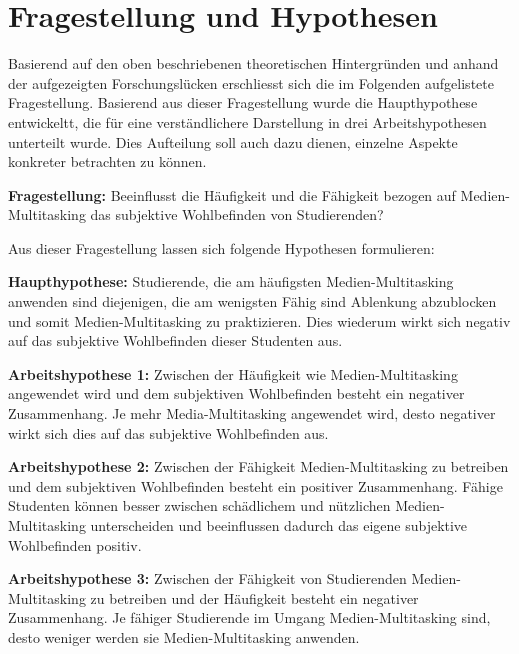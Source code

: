 \section{Fragestellung und Hypothesen}\label{section.fragestellung}
Basierend auf den oben beschriebenen theoretischen Hintergründen und anhand der aufgezeigten Forschungslücken erschliesst sich die im Folgenden aufgelistete Fragestellung. Basierend aus dieser Fragestellung wurde die Haupthypothese entwickeltt, die für eine verständlichere Darstellung in drei Arbeitshypothesen unterteilt wurde. Dies Aufteilung soll auch dazu dienen, einzelne Aspekte konkreter betrachten zu können. \par
\textbf{Fragestellung:} Beeinflusst die Häufigkeit und die Fähigkeit bezogen auf Medien-Multitasking das subjektive Wohlbefinden von Studierenden?\par
Aus dieser Fragestellung lassen sich folgende Hypothesen formulieren:\par
\textbf{Haupthypothese:}
Studierende, die am häufigsten Medien-Multitasking anwenden sind diejenigen, die am wenigsten Fähig sind Ablenkung abzublocken und somit Medien-Multitasking zu praktizieren. Dies wiederum wirkt sich negativ auf das subjektive Wohlbefinden dieser Studenten aus.\par
\textbf{Arbeitshypothese 1:} Zwischen der Häufigkeit wie Medien-Multitasking angewendet wird und dem subjektiven Wohlbefinden besteht ein negativer Zusammenhang. Je mehr Media-Multitasking angewendet wird, desto negativer wirkt sich dies auf das subjektive Wohlbefinden aus.\par
\textbf{Arbeitshypothese 2:} Zwischen der Fähigkeit Medien-Multitasking zu betreiben und dem subjektiven Wohlbefinden besteht ein positiver Zusammenhang. Fähige Studenten können besser zwischen schädlichem und nützlichen Medien-Multitasking unterscheiden und beeinflussen dadurch das eigene subjektive Wohlbefinden positiv.\par
\textbf{Arbeitshypothese 3:} Zwischen der Fähigkeit von Studierenden Medien-Multitasking zu betreiben und der Häufigkeit besteht ein negativer Zusammenhang. Je fähiger Studierende im Umgang Medien-Multitasking sind, desto weniger werden sie Medien-Multitasking anwenden.






